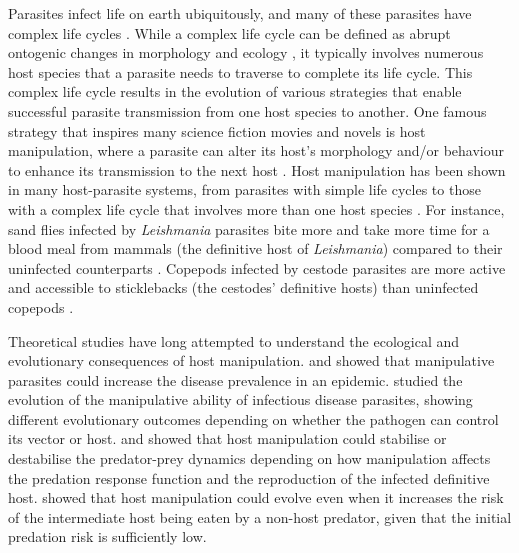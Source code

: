 \documentclass[a4paper]{scrartcl}
\begin{document}
Parasites infect life on earth ubiquitously, and many of these parasites have complex life cycles \citep{zimmer:book:2001}. 
While a complex life cycle can be defined as abrupt ontogenic changes in morphology and ecology \citep{Benesh:2016dj}, it typically involves numerous host species that a parasite needs to traverse to complete its life cycle. 
This complex life cycle results in the evolution of various strategies that enable successful parasite transmission from one host species to another. 
One famous strategy that inspires many science fiction movies and novels is host manipulation, where a parasite can alter its host's morphology and/or behaviour to enhance its transmission to the next host \citep{Hughes2012}. 
Host manipulation has been shown in many host-parasite systems, from parasites with simple life cycles to those with a complex life cycle that involves more than one host species \citep{Hughes2012,molyneux_jefferies1986}. 
For instance, sand flies infected by \textit{Leishmania} parasites bite more and take more time for a blood meal from mammals (the definitive host of \textit{Leishmania}) compared to their uninfected counterparts \citep{Rogers2007}. 
Copepods infected by cestode parasites are more active and accessible to sticklebacks (the cestodes' definitive hosts) than uninfected copepods \citep{Wedekind1996}.

Theoretical studies have long attempted to understand the ecological and evolutionary consequences of host manipulation. 
\cite{Roosien2013} and \cite{Hosack2008} showed that manipulative parasites could increase the disease prevalence in an epidemic. \cite{Gandon2018} studied the evolution of the manipulative ability of infectious disease parasites, showing different evolutionary outcomes depending on whether the pathogen can control its vector or host.
\cite{Hadeler1989, Fenton2006} and \cite{Rogawa2018} showed that host manipulation could stabilise or destabilise the predator-prey dynamics depending on how manipulation affects the predation response function and the reproduction of the infected definitive host. 
\cite{Seppl2008} showed that host manipulation could evolve even when it increases the risk of the intermediate host being eaten by a non-host predator, given that the initial predation risk is sufficiently low.  
\end{document}
